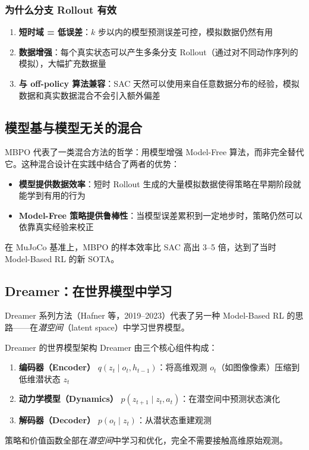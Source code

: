 \subsubsection{为什么分支 Rollout 有效}

\begin{enumerate}
    \item \textbf{短时域 = 低误差}：$k$ 步以内的模型预测误差可控，模拟数据仍然有用
    \item \textbf{数据增强}：每个真实状态可以产生多条分支 Rollout（通过对不同动作序列的模拟），大幅扩充数据量
    \item \textbf{与 off-policy 算法兼容}：SAC 天然可以使用来自任意数据分布的经验，模拟数据和真实数据混合不会引入额外偏差
\end{enumerate}

\subsection{模型基与模型无关的混合}

MBPO 代表了一类混合方法的哲学：用模型增强 Model-Free 算法，而非完全替代它。这种混合设计在实践中结合了两者的优势：

\begin{itemize}
    \item \textbf{模型提供数据效率}：短时 Rollout 生成的大量模拟数据使得策略在早期阶段就能学到有用的行为
    \item \textbf{Model-Free 策略提供鲁棒性}：当模型误差累积到一定地步时，策略仍然可以依靠真实经验来校正
\end{itemize}

在 MuJoCo 基准上，MBPO 的样本效率比 SAC 高出 3--5 倍，达到了当时 Model-Based RL 的新 SOTA。

\subsection{Dreamer：在世界模型中学习}

Dreamer 系列方法（Hafner 等，2019--2023）代表了另一种 Model-Based RL 的思路——在\emph{潜空间}（latent space）中学习世界模型。

\begin{mydefinition}{Dreamer 的世界模型架构}
Dreamer 由三个核心组件构成：
\begin{enumerate}
    \item \textbf{编码器（Encoder）} $q(z_t \mid o_t, h_{t-1})$：将高维观测 $o_t$（如图像像素）压缩到低维潜状态 $z_t$
    \item \textbf{动力学模型（Dynamics）} $p(z_{t+1} \mid z_t, a_t)$：在潜空间中预测状态演化
    \item \textbf{解码器（Decoder）} $p(o_t \mid z_t)$：从潜状态重建观测
\end{enumerate}

策略和价值函数全部在\emph{潜空间}中学习和优化，完全不需要接触高维原始观测。
\end{mydefinition}

